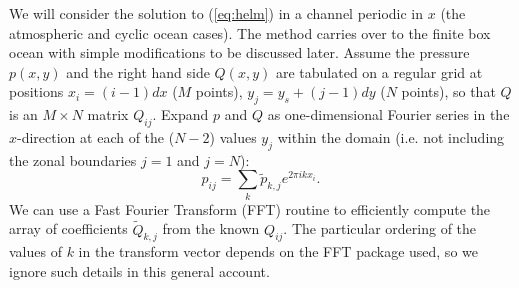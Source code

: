 \documentclass[11pt, a4paper,twoside]{article}
\numberwithin{equation}{section}
\begin{document}
We will consider the solution to (\ref{eq:helm}) in a channel periodic in $x$ (the atmospheric and cyclic ocean cases).
The method carries over to the finite box ocean with simple modifications to be discussed later.
Assume the pressure $p(x,y)$ and the right hand side $ Q(x,y)$ are tabulated on a regular grid at positions $x_i = (i-1)dx$  ($M$ points),  $y_j = y_s + (j-1)dy$ ($N$ points), so that $ Q$ is an $M \times N$ matrix $ Q_{ij}$.
Expand $p$ and $ Q$ as one-dimensional Fourier series in the $x$-direction at each of the ($N-2$) values $y_j$ within the domain (i.e. not including the zonal boundaries $j=1$ and $j=N$):
\begin{equation}\label{eq:four6}
p_{ij} = \sum_k \tilde{p}_{k,j} e^{2\pi i k x_i}.
\end{equation}
We can use a Fast Fourier Transform (FFT) routine to efficiently compute the array of coefficients $\tilde{ Q}_{k,j}$ from the known $ Q_{ij}$.
The particular ordering of the values of $k$ in the transform vector depends on the FFT package used, so we ignore such details in this general account.
\end{document}
